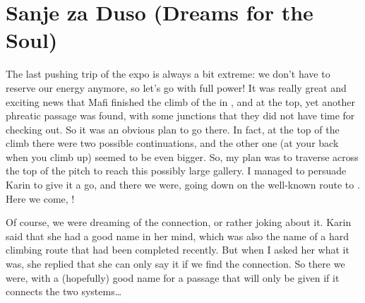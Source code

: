 \section{Sanje za Duso (Dreams for the Soul)}



The last pushing trip of the expo is always a bit extreme: we don't have
to reserve our energy anymore, so let's go with full power! It was
really great and exciting news that Mafi finished the climb of the
 in , and at the top, yet
another phreatic passage was found, with some junctions that they did
not have time for checking out. So it was an obvious plan to go there.
In fact, at the top of the climb there were two possible continuations,
and the other one (at your back when you climb up) seemed to be even
bigger. So, my plan was to traverse across the top of the pitch to reach
this possibly large gallery. I managed to persuade Karin to give it a
go, and there we were, going down on the well-known route to
. Here we come, !

Of course, we were dreaming of the connection, or rather joking about
it. Karin said that she had a good name in her mind, which was also the
name of a hard climbing route that had been completed recently. But when
I asked her what it was, she replied that she can only say it if we find
the connection. So there we were, with a (hopefully) good name for a
passage that will only be given if it connects the two systems\ldots{}


